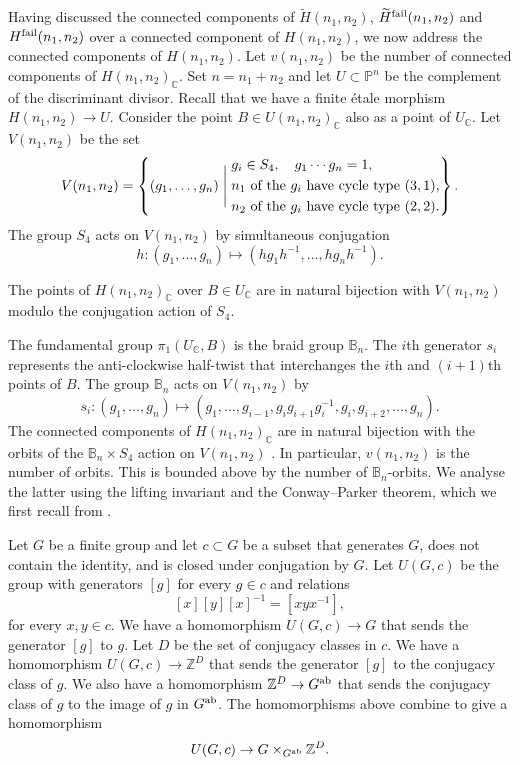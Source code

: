 \documentclass{amsart}
\numberwithin{equation}{section} \numberwithin{figure}{section}
\newcommand\PP{\mathbb{P}}
\newcommand\ZZ{\mathbb{Z}}
\newcommand\CC{\mathbb{C}}
\theoremstyle{one}
\theoremstyle{definition}
\begin{document}
Having discussed the connected components of \(\widetilde H(n_1,n_2)\), \(\widetilde H^{\rm fail}(n_1,n_2)\) and \(H^{\rm fail}(n_1,n_2)\) over a connected component of \(H(n_1,n_2)\), we now address the connected components of \(H(n_1,n_2)\).
Let \(v(n_1,n_2)\) be the number of connected components of \(H(n_1,n_2)_{\CC}\).
Set \(n = n_1+n_2\) and let \(U \subset \PP^n\) be the complement of the discriminant divisor.
Recall that we have a finite \'etale morphism \(H(n_1,n_2) \to U\).
Consider the point \(B \in U(n_1,n_2)_{\CC}\) also as a point of \(U_{\CC}\).
Let \(V(n_1,n_2)\) be the set
\begin{equation}\label{def:V} 
  V(n_1,n_2) = \left\{(g_1, \dots, g_n) \Biggm|
    \begin{split}
      &g_i \in S_4, \quad g_1 \cdots g_n = 1,\\
      &\text{\(n_1\) of the \(g_i\) have cycle type \((3,1)\),} \\
      &\text{\(n_2\) of the \(g_i\) have cycle type \((2,2)\).}
    \end{split}
    \right\}.
  \end{equation}  
  The group \(S_4\) acts on \(V(n_1,n_2)\) by simultaneous conjugation
\[ h \colon (g_1, \dots, g_n) \mapsto (hg_1h^{-1}, \dots,  hg_nh^{-1}). \] 
 
   The points of \(H(n_1,n_2)_{\CC}\) over \(B \in U_{\CC}\) are in natural bijection with \(V(n_1,n_2)\) modulo the conjugation action of \(S_4\).

   The fundamental group \(\pi_1(U_{\CC},B)\) is the braid group \(\mathbb{B}_n\).
The \(i\)th generator \(s_i\) represents the anti-clockwise half-twist that interchanges the \(i\)th and \((i+1)\)th points of \(B\).
The group
\(\mathbb{B}_n\) acts on \(V(n_1,n_2)\) by 
\[s_i \colon (g_1, \dots, g_n) \mapsto (g_1, \dots,  g_{i-1}, g_{i}g_{i+1}g_{i}^{-1}, g_{i}, g_{i+2},\dots, g_n).\]
The connected components of \(H(n_1,n_2)_{\CC}\) are in natural bijection with the orbits of the \(\mathbb{B}_n \times S_4\) action on \(V(n_1,n_2)\) \cite[Section 1.3]{fri.vol:91}. In particular, \(v(n_1,n_2)\) is the number of orbits.
This is bounded above by the number of {\(\mathbb{B}_n\)}-orbits.
We analyse the latter using the lifting invariant and the Conway--Parker theorem, which we first recall from \cite{woo:21}.

Let \(G\) be a finite group and let \(c \subset G\) be a subset that generates \(G\), does not contain the identity, and is closed under conjugation by \(G\).
Let \(U(G,c)\) be the group with generators \([g]\) for every \(g \in c\) and relations
\[ [x][y][x]^{-1} = [xyx^{-1}],\]
for every \(x,y \in c\). 
We have a homomorphism \(U(G,c) \to G\) that sends the generator \([g]\) to \(g\).
Let \(D\) be the set of conjugacy classes in \(c\).
We have a homomorphism \(U(G,c) \to \ZZ^D\) that sends the generator \([g]\) to the conjugacy class of \(g\).
We also have a homomorphism \(\ZZ^D \to G^{\rm ab}\) that sends the conjugacy class of \(g\) to the image of \(g\) in \(G^{\rm ab}\).
The homomorphisms above combine to give a homomorphism
\[ U(G,c) \to G \times_{G^{\rm ab}} \ZZ^D.\]
\end{document}
